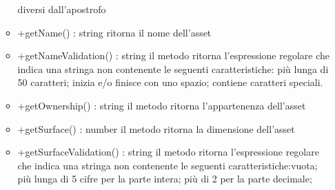 \begin{itemize}
\begin{itemize}
		diversi dall’apostrofo
		\item +getName() : string\newline
		ritorna il nome dell'asset
		\item +getNameValidation() : string\newline
		il metodo ritorna l'espressione regolare che indica una stringa non contenente le seguenti caratteristiche: più lunga di 50 caratteri; inizia e/o finisce con uno spazio; contiene caratteri speciali.
		\item +getOwnership() : string\newline
		il metodo ritorna l'appartenenza dell'asset
		\item +getSurface() : number\newline
		il metodo ritorna la dimensione dell'asset
		\item +getSurfaceValidation() : string\newline
		il metodo ritorna l'espressione regolare che indica una stringa non contenente le seguenti caratteristiche:vuota; più lunga di 5 cifre per la parte intera; più di 2 per la parte decimale;
		

\end{itemize}
\end{itemize}
